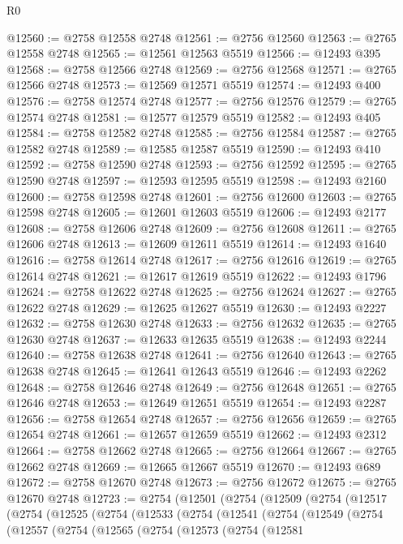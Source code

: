 \begin{lexlean}{R0}
\begin{coremodule}
@12560 := @2758 @12558 @2748
@12561 := @2756 @12560
@12563 := @2765 @12558 @2748
@12565 := @12561 @12563 @5519
@12566 := @12493 @395
@12568 := @2758 @12566 @2748
@12569 := @2756 @12568
@12571 := @2765 @12566 @2748
@12573 := @12569 @12571 @5519
@12574 := @12493 @400
@12576 := @2758 @12574 @2748
@12577 := @2756 @12576
@12579 := @2765 @12574 @2748
@12581 := @12577 @12579 @5519
@12582 := @12493 @405
@12584 := @2758 @12582 @2748
@12585 := @2756 @12584
@12587 := @2765 @12582 @2748
@12589 := @12585 @12587 @5519
@12590 := @12493 @410
@12592 := @2758 @12590 @2748
@12593 := @2756 @12592
@12595 := @2765 @12590 @2748
@12597 := @12593 @12595 @5519
@12598 := @12493 @2160
@12600 := @2758 @12598 @2748
@12601 := @2756 @12600
@12603 := @2765 @12598 @2748
@12605 := @12601 @12603 @5519
@12606 := @12493 @2177
@12608 := @2758 @12606 @2748
@12609 := @2756 @12608
@12611 := @2765 @12606 @2748
@12613 := @12609 @12611 @5519
@12614 := @12493 @1640
@12616 := @2758 @12614 @2748
@12617 := @2756 @12616
@12619 := @2765 @12614 @2748
@12621 := @12617 @12619 @5519
@12622 := @12493 @1796
@12624 := @2758 @12622 @2748
@12625 := @2756 @12624
@12627 := @2765 @12622 @2748
@12629 := @12625 @12627 @5519
@12630 := @12493 @2227
@12632 := @2758 @12630 @2748
@12633 := @2756 @12632
@12635 := @2765 @12630 @2748
@12637 := @12633 @12635 @5519
@12638 := @12493 @2244
@12640 := @2758 @12638 @2748
@12641 := @2756 @12640
@12643 := @2765 @12638 @2748
@12645 := @12641 @12643 @5519
@12646 := @12493 @2262
@12648 := @2758 @12646 @2748
@12649 := @2756 @12648
@12651 := @2765 @12646 @2748
@12653 := @12649 @12651 @5519
@12654 := @12493 @2287
@12656 := @2758 @12654 @2748
@12657 := @2756 @12656
@12659 := @2765 @12654 @2748
@12661 := @12657 @12659 @5519
@12662 := @12493 @2312
@12664 := @2758 @12662 @2748
@12665 := @2756 @12664
@12667 := @2765 @12662 @2748
@12669 := @12665 @12667 @5519
@12670 := @12493 @689
@12672 := @2758 @12670 @2748
@12673 := @2756 @12672
@12675 := @2765 @12670 @2748
@12723 := @2754
    (@12501
      (@2754
        (@12509
          (@2754
            (@12517
              (@2754
                (@12525
                  (@2754
                    (@12533
                      (@2754
                        (@12541
                          (@2754
                            (@12549
                              (@2754
                                (@12557
                                  (@2754
                                    (@12565
                                      (@2754
                                        (@12573
                                          (@2754
                                            (@12581

\end{coremodule}
\end{lexlean}
